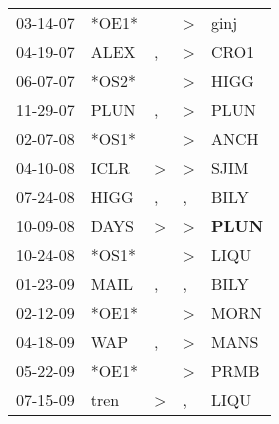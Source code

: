 \begin{supertabular}{p{0.07\textwidth}p{0.06\textwidth}p{0.02\textwidth}p{0.02\textwidth}p{0.06\textwidth}}
          03-14-07\textsuperscript{} &                            *OE1* &                  &     \textgreater &           ginj\textsuperscript{} \\
          04-19-07\textsuperscript{} &           ALEX\textsuperscript{} &                , &     \textgreater &           CRO1\textsuperscript{} \\
          06-07-07\textsuperscript{} &                            *OS2* &                  &     \textgreater &           HIGG\textsuperscript{} \\
          11-29-07\textsuperscript{} &           PLUN\textsuperscript{} &                , &     \textgreater &           PLUN\textsuperscript{} \\
          02-07-08\textsuperscript{} &                            *OS1* &                  &     \textgreater &           ANCH\textsuperscript{} \\
          04-10-08\textsuperscript{} &           ICLR\textsuperscript{} &     \textgreater &     \textgreater &           SJIM\textsuperscript{} \\
          07-24-08\textsuperscript{} &           HIGG\textsuperscript{} &                , &                , &           BILY\textsuperscript{} \\
          10-09-08\textsuperscript{} &           DAYS\textsuperscript{} &     \textgreater &     \textgreater &  \textbf{PLUN\textsuperscript{}} \\
          10-24-08\textsuperscript{} &                            *OS1* &                  &     \textgreater &           LIQU\textsuperscript{} \\
          01-23-09\textsuperscript{} &           MAIL\textsuperscript{} &                , &                , &           BILY\textsuperscript{} \\
          02-12-09\textsuperscript{} &                            *OE1* &                  &     \textgreater &           MORN\textsuperscript{} \\
          04-18-09\textsuperscript{} &            WAP\textsuperscript{} &                , &     \textgreater &           MANS\textsuperscript{} \\
          05-22-09\textsuperscript{} &                            *OE1* &                  &     \textgreater &           PRMB\textsuperscript{} \\
          07-15-09\textsuperscript{} &           tren\textsuperscript{} &     \textgreater &                , &           LIQU\textsuperscript{} \\

\end{supertabular}
